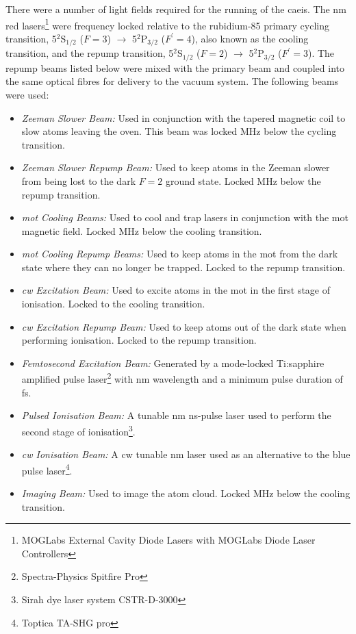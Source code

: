 There were a number of light fields required for the running of the \gls{caeis}.
The \unit[780]{nm} red lasers\footnote{MOGLabs External Cavity Diode Lasers with MOGLabs Diode Laser Controllers} were frequency locked relative to the rubidium-85 primary cycling transition, 5$^2$S$_{1/2}$ ($F=3$) $\rightarrow$ 5$^2$P$_{3/2}$ ($F^\prime=4$), also known as the cooling transition, and the repump transition, 5$^2$S$_{1/2}$ ($F=2$) $\rightarrow$ 5$^2$P$_{3/2}$ ($F^\prime=3$).
The repump beams listed below were mixed with the primary beam and coupled into the same optical fibres for delivery to the vacuum system.
The following beams were used:
\begin{itemize}
    \item{\emph{Zeeman Slower Beam:}} Used in conjunction with the tapered magnetic coil to slow atoms leaving the oven. This beam was locked \unit[250]{MHz} below the cycling transition.
    \item{\emph{Zeeman Slower Repump Beam:}} Used to keep atoms in the Zeeman slower from being lost to the dark $F=2$ ground state. Locked \unit[250]{MHz} below the repump transition.
    \item{\emph{\Gls{mot} Cooling Beams:}} Used to cool and trap lasers in conjunction with the \gls{mot} magnetic field. Locked \unit[10]{MHz} below the cooling transition.
    \item{\emph{\Gls{mot} Cooling Repump Beams:}} Used to keep atoms in the \gls{mot} from the dark state where they can no longer be trapped. Locked to the repump transition.
    \item{\emph{\Gls{cw} Excitation Beam:}} Used to excite atoms in the \gls{mot} in the first stage of ionisation. Locked to the cooling transition.
    \item{\emph{\Gls{cw} Excitation Repump Beam:}} Used to keep atoms out of the dark state when performing ionisation. Locked to the repump transition.
    \item{\emph{Femtosecond Excitation Beam:}} Generated by a mode-locked Ti:sapphire amplified pulse laser\footnote{Spectra-Physics Spitfire Pro} with \unit[780-830]{nm} wavelength and a minimum pulse duration of \unit[35]{fs}.
    \item{\emph{Pulsed Ionisation Beam:}} A tunable \unit[457-493]{nm} \unit[10]{ns}-pulse laser used to perform the second stage of ionisation\footnote{Sirah dye laser system CSTR-D-3000}.
    \item{\emph{\Gls{cw} Ionisation Beam:}} A \gls{cw} tunable \unit[480]{nm} laser used as an alternative to the blue pulse laser\footnote{Toptica TA-SHG pro}.
    \item{\emph{Imaging Beam:}} Used to image the atom cloud. Locked \unit[4]{MHz} below the cooling transition.
\end{itemize}


